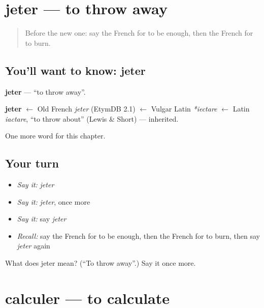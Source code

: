 \section[jeter]{jeter — to throw away}

\label{lesson:FR-C236-jeter}



\begin{quote}
Before the new one: say the French for to be enough, then the French for to burn.
\end{quote}

\subsection*{You'll want to know: jeter}
\textbf{jeter} — \textquotedblleft{}to throw away\textquotedblright{}.

\begin{cousinweb}
\textbf{jeter} $\leftarrow$ Old French \emph{jeter} (EtymDB 2.1) $\leftarrow$ Vulgar Latin \emph{*iectare} $\leftarrow$ Latin \emph{iactare}, \textquotedblleft{}to throw about\textquotedblright{} (Lewis \& Short) — inherited.
\end{cousinweb}

\begin{grammarlens}[title={What you've built}]
One more word for this chapter.
\end{grammarlens}

\subsection*{Your turn}
\begin{itemize}
\raggedright
  \item \emph{Say it:} \emph{jeter}
  \item \emph{Say it:} \emph{jeter}, once more
  \item \emph{Say it:} say \emph{jeter}
  \item \emph{Recall:} say the French for to be enough, then the French for to burn, then say \emph{jeter} again
\end{itemize}

\begin{tcolorbox}[breakable,colback=teal!4,colframe=teal!35!black,title={Before you move on}]
What does jeter mean? (\textquotedblleft{}To throw away\textquotedblright{}.) Say it once more.
\end{tcolorbox}
\section[calculer]{calculer — to calculate}

